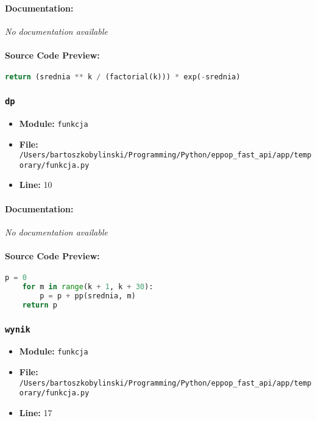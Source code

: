 \documentclass[11pt,a4paper]{article}
\begin{document}
\paragraph{Documentation:} \textit{No documentation available}

\paragraph{Source Code Preview:}
\begin{lstlisting}[language=Python]
    return (srednia ** k / (factorial(k))) * exp(-srednia)
\end{lstlisting}

\vspace{1em}
\subsubsection{\texttt{dp}}

\begin{itemize}
    \item \textbf{Module:} \texttt{funkcja}
    \item \textbf{File:} \texttt{/Users/bartoszkobylinski/Programming/Python/eppop\_fast\_api/app/temporary/funkcja.py}
    \item \textbf{Line:} 10
\end{itemize}

\paragraph{Documentation:} \textit{No documentation available}

\paragraph{Source Code Preview:}
\begin{lstlisting}[language=Python]
    p = 0
    for m in range(k + 1, k + 30):
        p = p + pp(srednia, m)
    return p
\end{lstlisting}

\vspace{1em}
\subsubsection{\texttt{wynik}}

\begin{itemize}
    \item \textbf{Module:} \texttt{funkcja}
    \item \textbf{File:} \texttt{/Users/bartoszkobylinski/Programming/Python/eppop\_fast\_api/app/temporary/funkcja.py}
    \item \textbf{Line:} 17
\end{itemize}
\end{document}
